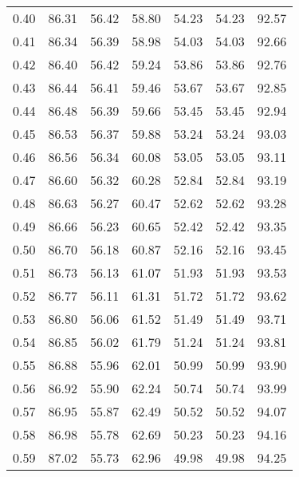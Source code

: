 \begin{tabular}{|c|c|c|c|c|c|c|}
      0.40 &     86.31 &     56.42 &      58.80 &   54.23 &      54.23 &         92.57 \\
      0.41 &     86.34 &     56.39 &      58.98 &   54.03 &      54.03 &         92.66 \\
      0.42 &     86.40 &     56.42 &      59.24 &   53.86 &      53.86 &         92.76 \\
      0.43 &     86.44 &     56.41 &      59.46 &   53.67 &      53.67 &         92.85 \\
      0.44 &     86.48 &     56.39 &      59.66 &   53.45 &      53.45 &         92.94 \\
      0.45 &     86.53 &     56.37 &      59.88 &   53.24 &      53.24 &         93.03 \\
      0.46 &     86.56 &     56.34 &      60.08 &   53.05 &      53.05 &         93.11 \\
      0.47 &     86.60 &     56.32 &      60.28 &   52.84 &      52.84 &         93.19 \\
      0.48 &     86.63 &     56.27 &      60.47 &   52.62 &      52.62 &         93.28 \\
      0.49 &     86.66 &     56.23 &      60.65 &   52.42 &      52.42 &         93.35 \\
      0.50 &     86.70 &     56.18 &      60.87 &   52.16 &      52.16 &         93.45 \\
      0.51 &     86.73 &     56.13 &      61.07 &   51.93 &      51.93 &         93.53 \\
      0.52 &     86.77 &     56.11 &      61.31 &   51.72 &      51.72 &         93.62 \\
      0.53 &     86.80 &     56.06 &      61.52 &   51.49 &      51.49 &         93.71 \\
      0.54 &     86.85 &     56.02 &      61.79 &   51.24 &      51.24 &         93.81 \\
      0.55 &     86.88 &     55.96 &      62.01 &   50.99 &      50.99 &         93.90 \\
      0.56 &     86.92 &     55.90 &      62.24 &   50.74 &      50.74 &         93.99 \\
      0.57 &     86.95 &     55.87 &      62.49 &   50.52 &      50.52 &         94.07 \\
      0.58 &     86.98 &     55.78 &      62.69 &   50.23 &      50.23 &         94.16 \\
      0.59 &     87.02 &     55.73 &      62.96 &   49.98 &      49.98 &         94.25 \\

\end{tabular}
